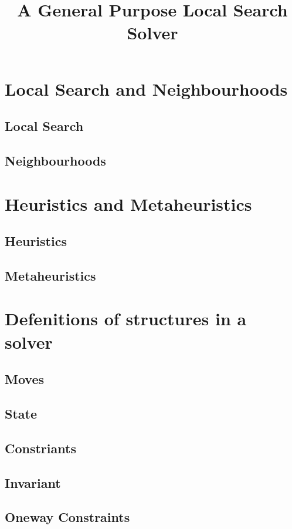 \documentclass[a4paper,10pt]{article}
\title{A General Purpose Local Search Solver}
\begin{document}
\maketitle

\section{Local Search and Neighbourhoods}
\subsection{Local Search}
\subsection{Neighbourhoods}
\section{Heuristics and Metaheuristics}
\subsection{Heuristics}
\subsection{Metaheuristics}
\section{Defenitions of structures in a solver}

\subsection{Moves}
\subsection{State}
\subsection{Constriants}
\subsection{Invariant}

\subsection{Oneway Constraints}

\end{document}
